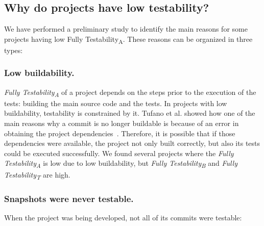 
\subsection{Why do projects have low testability?}
\label{sec:low-testability}

We have performed a preliminary study to identify the main reasons for some projects having low Fully Testability\textsubscript{A}. 
These reasons can be organized in three types:

\subsubsection{Low buildability.} 

\textit{Fully Testability\textsubscript{A}} of a project depends on the steps prior to the execution of the tests: building the main source code and the tests.
In projects with low buildability, testability is constrained by it.
Tufano et al. showed how one of the main reasons why a commit is no longer buildable is because of an error in obtaining the project dependencies~\cite{tufano2017there}. 
Therefore, it is possible that if those dependencies were available, the project not only built correctly, but also its tests could be executed successfully. 
We found several projects where the \textit{Fully Testability\textsubscript{A}} is low due to low buildability, but \textit{Fully Testability\textsubscript{B}} and \textit{Fully Testability\textsubscript{T}} are high.

\subsubsection{Snapshots were never testable.} When the project was being developed, not all of its commits were testable:

